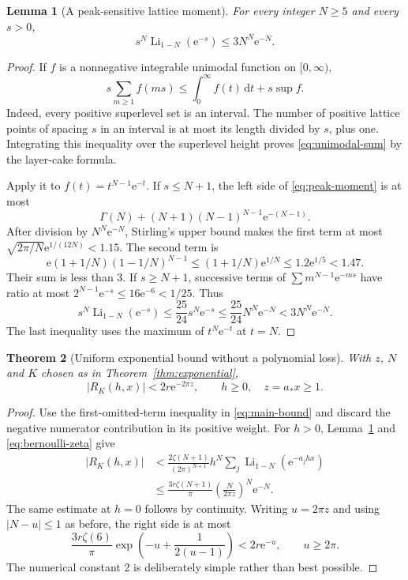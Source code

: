 \documentclass[11pt,a4paper]{article}
\numberwithin{equation}{section}
\newtheorem{theorem}{Theorem}[section]
\newtheorem{lemma}[theorem]{Lemma}
\theoremstyle{definition}\newtheorem{definition}[theorem]{Definition}
\theoremstyle{remark}\newtheorem{remark}[theorem]{Remark}
\DeclareMathOperator{\Li}{Li}
\newcommand{\e}{\mathrm e}
\newcommand{\dd}{\,\mathrm d}
\newcommand{\amin}{a_*}
\begin{document}
\begin{lemma}[A peak-sensitive lattice moment]
\label{lem:peak-moment}
For every integer $N\ge5$ and every $s>0$,
\begin{equation}
 s^N\Li_{1-N}(\e^{-s})\le 3N^N\e^{-N}.
 \label{eq:peak-moment}
\end{equation}
\end{lemma}
\begin{proof}
If $f$ is a nonnegative integrable unimodal function on $[0,\infty)$,
\begin{equation}
 s\sum_{m\ge1}f(ms)\le\int_0^\infty f(t)\dd t+s\sup f.
 \label{eq:unimodal-sum}
\end{equation}
Indeed, every positive superlevel set is an interval. The number of positive
lattice points of spacing $s$ in an interval is at most its length divided
by $s$, plus one. Integrating this inequality over the superlevel height
proves \eqref{eq:unimodal-sum} by the layer-cake formula.

Apply it to $f(t)=t^{N-1}\e^{-t}$. If $s\le N+1$, the left side of
\eqref{eq:peak-moment} is at most
\[
 \Gamma(N)+(N+1)(N-1)^{N-1}\e^{-(N-1)}.
\]
After division by $N^N\e^{-N}$, Stirling's upper bound makes the first term
at most $\sqrt{2\pi/N}\e^{1/(12N)}<1.15$. The second term is
\[
 \e(1+1/N)(1-1/N)^{N-1}
 \le(1+1/N)\e^{1/N}\le1.2\e^{1/5}<1.47.
\]
Their sum is less than 3. If $s\ge N+1$, successive terms of
$\sum m^{N-1}\e^{-ms}$ have ratio at most
$2^{N-1}\e^{-s}\le16\e^{-6}<1/25$. Thus
\[
 s^N\Li_{1-N}(\e^{-s})
 \le\frac{25}{24}s^N\e^{-s}
 \le\frac{25}{24}N^N\e^{-N}<3N^N\e^{-N}.
\]
The last inequality uses the maximum of $t^N\e^{-t}$ at $t=N$.
\end{proof}

\begin{theorem}[Uniform exponential bound without a polynomial loss]
\label{thm:constant-envelope}
With $z$, $N$ and $K$ chosen as in Theorem~\ref{thm:exponential},
\begin{equation}
 \boxed{\quad |R_K(h,x)|<2r\e^{-2\pi z},
           \qquad h\ge0,\quad z=\amin x\ge1.\quad}
 \label{eq:constant-envelope}
\end{equation}
\end{theorem}
\begin{proof}
Use the first-omitted-term inequality in \eqref{eq:main-bound} and discard
the negative numerator contribution in its positive weight. For $h>0$,
Lemma~\ref{lem:peak-moment} and \eqref{eq:bernoulli-zeta} give
\begin{align*}
 |R_K(h,x)|
 &<\frac{2\zeta(N+1)}{(2\pi)^{N+1}}
     h^N\sum_j\Li_{1-N}(\e^{-a_jhx})\\
 &\le\frac{3r\zeta(N+1)}{\pi}
                   \left(\frac{N}{2\pi z}\right)^N\e^{-N}.
\end{align*}
The same estimate at $h=0$ follows by continuity. Writing $u=2\pi z$ and
using $|N-u|\le1$ as before, the right side is at most
\[
 \frac{3r\zeta(6)}{\pi}
       \exp\left(-u+\frac1{2(u-1)}\right)<2r\e^{-u},
 \qquad u\ge2\pi.
\]
The numerical constant 2 is deliberately simple rather than best possible.
\end{proof}
\end{document}
